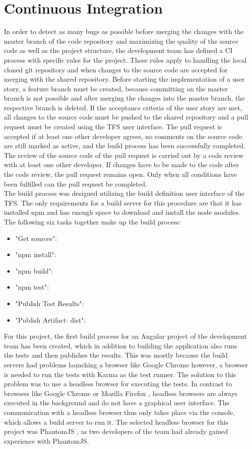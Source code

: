 \documentclass[Bachelor,BIF,english]{twbook}
\begin{document}
\section{Continuous Integration}
In order to detect as many bugs as possible before merging the changes with the master branch of the code repository and maximizing the quality of the source code as well as the project structure, the development team has defined a CI process with specific rules for the project. These rules apply to handling the local cloned git repository and when changes to the source code are accepted for merging with the shared repository. Before starting the implementation of a user story, a feature branch must be created, because committing on the master branch is not possible and after merging the changes into the master branch, the respective branch is deleted. If the acceptance criteria of the user story are met, all changes to the source code must be pushed to the shared repository and a pull request must be created using the TFS user interface. The pull request is accepted if at least one other developer agrees, no comments on the source code are still marked as active, and the build process has been successfully completed. The review of the source code of the pull request is carried out by a code review with at least one other developer. If changes have to be made to the code after the code review, the pull request remains open. Only when all conditions have been fulfilled can the pull request be completed.
\\[\baselineskip]
The build process was designed utilizing the build definition user interface of the TFS. The only requirements for a build server for this procedure are that it has installed npm and has enough space to download and install the node modules. The following six tasks together make up the build process:
\begin{itemize}
\item "Get sources":
\item "npm install":
\item "npm build": 
\item "npm test": 
\item "Publish Test Results":
\item "Publish Artifact: dist":
\end{itemize}
For this project, the first build process for an Angular project of the development team has been created, which in addition to building the application also runs the tests and then publishes the results. This was mostly because the build servers had problems launching a browser like Google Chrome however, a browser is needed to run the tests with Karma as the test runner. The solution to this problem was to use a headless browser \cite[p.~2]{HeadlessBrowser} for executing the tests. In contrast to browsers like Google Chrome \cite{Chrome} or Mozilla Firefox \cite{Firefox}, headless browsers are always executed in the background and do not have a graphical user interface. The communication with a headless browser thus only takes place via the console, which allows a build server to run it. The selected headless browser for this project was PhantomJS \cite{PhantomJS}, as two developers of the team had already gained experience with PhantomJS.
\end{document}
